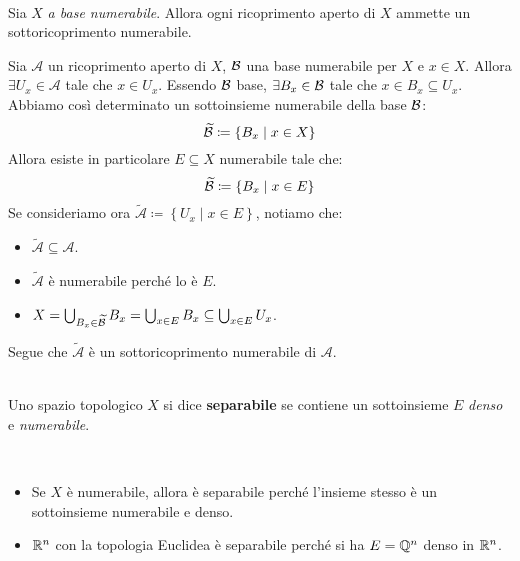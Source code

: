 \begin{proposition}~{}\\
Sia $X$ \textit{a base numerabile}. Allora ogni ricoprimento aperto di $X$ ammette un sottoricoprimento numerabile.
\end{proposition}
\begin{demonstration}
Sia $\mathcal{A}$ un ricoprimento aperto di $X$, $\mathcal{B}$ una base numerabile per $X$ e $x\in X$. Allora $\exists U_x\in\mathcal{A}$ tale che $x\in U_x$. Essendo $\mathcal{B}$ base, $\exists B_x\in\mathcal{B}$ tale che $x\in B_x\subseteq U_x$.\\
Abbiamo così determinato un sottoinsieme numerabile della base $\mathcal{B}$:
\begin{equation*}
\widetilde{\mathcal{B}}\coloneqq\left\{B_x\mid x\in X\right\}
\end{equation*}
Allora esiste in particolare $E\subseteq X$ numerabile tale che:
\begin{equation*}
\widetilde{\mathcal{B}}\coloneqq\left\{B_x\mid x\in E\right\}
\end{equation*}
Se consideriamo ora $\widetilde{\mathcal{A}}\coloneqq\left\{U_x\mid x\in E\right\}$, notiamo che:
\begin{itemize}
	\item $\widetilde{\mathcal{A}}\subseteq \mathcal{A}$.
	\item $\widetilde{\mathcal{A}}$ è numerabile perché lo è $E$.
	\item $X=\mathop{{\bigcup}}\displaylimits_{B_x\in\widetilde{\mathcal{B}}}B_x=\mathop{{\bigcup}}\displaylimits_{x\in E}B_x\subseteq \mathop{{\bigcup}}\displaylimits_{x\in E}U_x $.
\end{itemize}
Segue che $\widetilde{\mathcal{A}}$ è un sottoricoprimento numerabile di $\mathcal{A}$.
\end{demonstration}
\begin{define}~{}\\
Uno spazio topologico $X$ si dice \textbf{separabile} se contiene un sottoinsieme $E$ \textit{denso} e \textit{numerabile}.
\end{define}
\begin{examples}~{}
	\begin{itemize}
		\item Se $X$ è numerabile, allora è separabile perché l'insieme stesso è un sottoinsieme numerabile e denso.
		\item $\mathbb{R}^n$ con la topologia Euclidea è separabile perché si ha $E=\mathbb{Q}^n$ denso in $\mathbb{R}^n$.
	\end{itemize}
\vspace{-3mm}
\end{examples}

